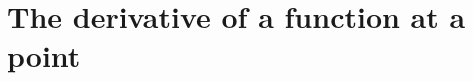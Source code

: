\section{The derivative of a function at a point} \label{S:1.3.DerivativePt}



\newpage



\newpage



\newpage



\newpage

